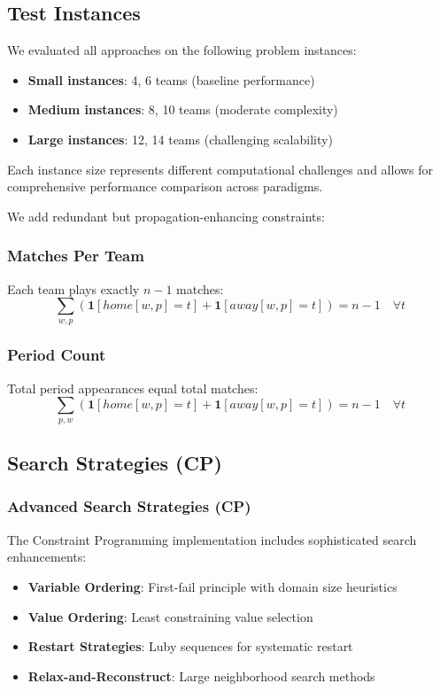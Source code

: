 \documentclass[11pt]{article}
\begin{document}
\subsection{Test Instances}

We evaluated all approaches on the following problem instances:
\begin{itemize}
    \item \textbf{Small instances}: 4, 6 teams (baseline performance)
    \item \textbf{Medium instances}: 8, 10 teams (moderate complexity)
    \item \textbf{Large instances}: 12, 14 teams (challenging scalability)
\end{itemize}

Each instance size represents different computational challenges and allows for comprehensive performance comparison across paradigms.

We add redundant but propagation-enhancing constraints:

\subsubsection{Matches Per Team}
Each team plays exactly $n-1$ matches:
\begin{equation}
\sum_{w,p} (\mathbf{1}[home[w,p] = t] + \mathbf{1}[away[w,p] = t]) = n-1 \quad \forall t
\end{equation}

\subsubsection{Period Count}
Total period appearances equal total matches:
\begin{equation}
\sum_{p,w} (\mathbf{1}[home[w,p] = t] + \mathbf{1}[away[w,p] = t]) = n-1 \quad \forall t
\end{equation}

\subsection{Search Strategies (CP)}
\subsubsection{Advanced Search Strategies (CP)}

The Constraint Programming implementation includes sophisticated search enhancements:

\begin{itemize}
    \item \textbf{Variable Ordering}: First-fail principle with domain size heuristics
    \item \textbf{Value Ordering}: Least constraining value selection
    \item \textbf{Restart Strategies}: Luby sequences for systematic restart
    \item \textbf{Relax-and-Reconstruct}: Large neighborhood search methods
\end{itemize}
\end{document}

